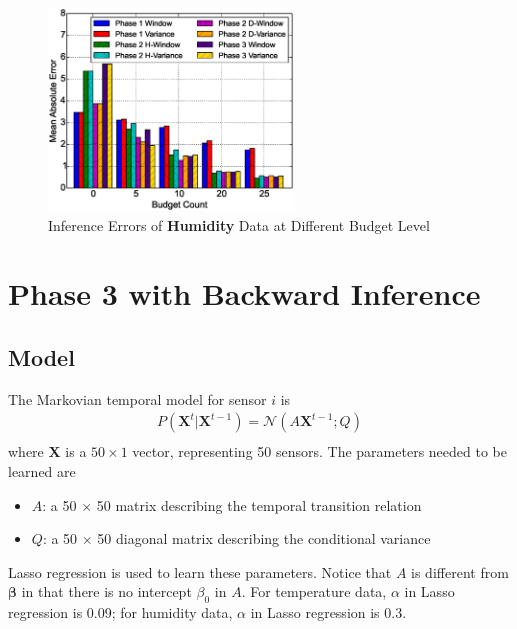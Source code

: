\documentclass[12pt]{article}  %
\theoremstyle{definition}
\theoremstyle{remark}
\begin{document}
\begin{figure}[H]
\centering
        \includegraphics[width=0.58\textwidth]{../phase3/humidity_err}
        \caption{Inference Errors of \textbf{Humidity} Data at Different Budget Level}
\label{fig:phase3:humidity}
\end{figure}



\section{Phase 3 with Backward Inference}

\subsection{Model}
The Markovian temporal model for sensor $i$ is
\begin{align}
        P(\mathbf{X}^t | \mathbf{X}^{t-1}) = \mathcal{N}(\mathit{A} \mathbf{X}^{t-1}; Q) \\
\end{align}
where $\mathbf{X}$ is a $50 \times 1$ vector, representing 50 sensors.
The parameters needed to be learned are
\begin{itemize}
\item $\mathit{A}$: a 50 $\times$ 50 matrix describing the temporal transition relation
\item $\mathit{Q}$: a 50 $\times$ 50 diagonal matrix describing the conditional variance
\end{itemize}
Lasso regression is used to learn these parameters.
Notice that $A$ is different from $\bm{\beta}$ in that there is no intercept $\beta_0$ in $A$.
For temperature data, $\alpha$ in Lasso regression is 0.09;
for humidity data, $\alpha$ in Lasso regression is 0.3.
\end{document}
